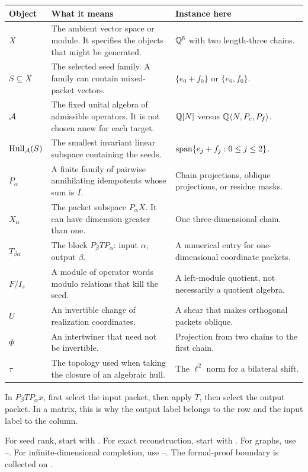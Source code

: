 {\small
\begin{tabularx}{\linewidth}{@{}>{\raggedright\arraybackslash}p{.15\linewidth}Y>{\raggedright\arraybackslash}p{.28\linewidth}@{}}\toprule
\textbf{Object} & \textbf{What it means} & \textbf{Instance here}\\\midrule
$X$ & The ambient vector space or module. It specifies the objects that might be generated. & $\QQ^6$ with two length-three chains.\\
$S\subseteq X$ & The selected seed family. A family can contain mixed-packet vectors. & $\{e_0+f_0\}$ or $\{e_0,f_0\}$.\\
$\AA$ & The fixed unital algebra of admissible operators. It is not chosen anew for each target. & $\QQ[N]$ versus $\QQ\langle N,P_e,P_f\rangle$.\\
$\Hull_{\AA}(S)$ & The smallest invariant linear subspace containing the seeds. & $\Span\{e_j+f_j:0\le j\le2\}$.\\
$P_\alpha$ & A finite family of pairwise annihilating idempotents whose sum is $I$. & Chain projections, oblique projections, or residue masks.\\
$X_\alpha$ & The packet subspace $P_\alpha X$. It can have dimension greater than one. & One three-dimensional chain.\\
$T_{\beta\alpha}$ & The block $P_\beta T P_\alpha$: input $\alpha$, output $\beta$. & A numerical entry for one-dimensional coordinate packets.\\
$F/I_s$ & A module of operator words modulo relations that kill the seed. & A left-module quotient, not necessarily a quotient algebra.\\
$U$ & An invertible change of realization coordinates. & A shear that makes orthogonal packets oblique.\\
$\Phi$ & An intertwiner that need not be invertible. & Projection from two chains to the first chain.\\
$\tau$ & The topology used when taking the closure of an algebraic hull. & The $\ell^2$ norm for a bilateral shift.\\\bottomrule
\end{tabularx}}

In $P_\beta T P_\alpha x$, first select the input packet, then apply $T$, then select the output packet. In a matrix, this is why the output label belongs to the row and the input label to the column.

For seed rank, start with . For exact reconstruction, start with . For graphs, use --. For infinite-dimensional completion, use --. The formal-proof boundary is collected on .

